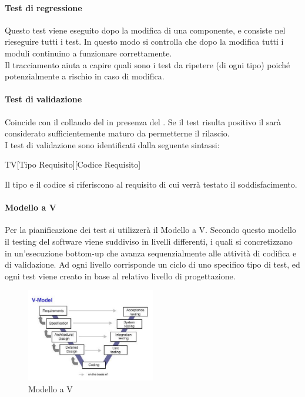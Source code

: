			\paragraph{Test di regressione}
				Questo test viene eseguito dopo la modifica di una componente, e consiste nel rieseguire tutti i test. In questo modo si controlla che dopo la modifica tutti i moduli continuino a funzionare correttamente. \\
				Il tracciamento aiuta a capire quali sono i test da ripetere (di ogni tipo) poiché potenzialmente a rischio in caso di modifica.
			\paragraph{Test di validazione}
				Coincide con il collaudo del  in presenza del . Se il test risulta positivo il  sarà considerato sufficientemente maturo da permetterne il rilascio. \\
				I test di validazione sono identificati dalla seguente sintassi:
				\begin{center}
					TV[Tipo Requisito][Codice Requisito]
				\end{center}
				Il tipo e il codice si riferiscono al requisito di cui verrà testato il soddisfacimento.
			\paragraph{Modello a V}
				Per la pianificazione dei test si utilizzerà il Modello a V. Secondo questo modello il testing del software viene suddiviso in livelli differenti, i quali si concretizzano in un'esecuzione bottom-up che avanza sequenzialmente alle attività di codifica e di validazione. Ad ogni livello corrisponde un ciclo di uno specifico tipo di test, ed ogni test viene creato in base al relativo livello di progettazione.
				\begin{figure}
					\centering
					\includegraphics[width=0.5\textwidth]{img/V-model.jpg}
					\caption{Modello a V}
				\end{figure}
